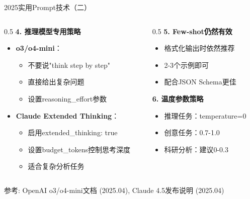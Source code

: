 \documentclass[aspectratio=169,11pt]{beamer}
\begin{document}
\begin{frame}{2025实用Prompt技术（二）}
    \begin{columns}
        \begin{column}{0.5\textwidth}
            \textbf{4. 推理模型专用策略}
            \begin{itemize}
                \item \textbf{o3/o4-mini}：
                    \begin{itemize}
                        \item 不要说"think step by step"
                        \item 直接给出复杂问题
                        \item 设置reasoning\_effort参数
                    \end{itemize}
                \item \textbf{Claude Extended Thinking}：
                    \begin{itemize}
                        \item 启用extended\_thinking: true
                        \item 设置budget\_tokens控制思考深度
                        \item 适合复杂分析任务
                    \end{itemize}
            \end{itemize}
        \end{column}
        \begin{column}{0.5\textwidth}
            \textbf{5. Few-shot仍然有效}
            \begin{itemize}
                \item 格式化输出时依然推荐
                \item 2-3个示例即可
                \item 配合JSON Schema更佳
            \end{itemize}
            
            \vspace{0.3cm}
            \textbf{6. 温度参数策略}
            \begin{itemize}
                \item 推理任务：temperature=0
                \item 创意任务：0.7-1.0
                \item 科研分析：建议0-0.3
            \end{itemize}
        \end{column}
    \end{columns}
    \vspace{0.2cm}
    {\scriptsize 参考: OpenAI o3/o4-mini文档 (2025.04), Claude 4.5发布说明 (2025.04)}
\end{frame}
\end{document}
